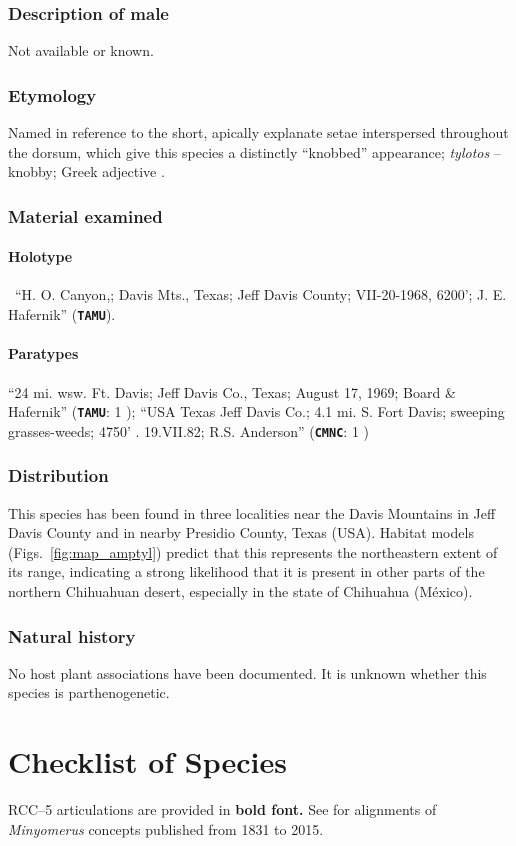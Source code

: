 \documentclass[fleqn,10pt,lineno]{wlpeerj} %
\begin{document}
		\subsubsection*{Description of male}
			Not available or known.
		\subsubsection*{Etymology}
			Named in reference to the short, apically explanate setae interspersed throughout the dorsum, which give this species a distinctly ``knobbed'' appearance; \textit{tylotos} -- knobby; Greek adjective \citep{brown1956}.
		\subsubsection*{Material examined}
			\paragraph{Holotype}
				\female~``H. O. Canyon,; Davis Mts., Texas; Jeff Davis County; VII-20-1968, 6200'; J. E. Hafernik'' (\texttt{\textbf{TAMU}}).
			\paragraph{Paratypes}
				``24 mi. wsw. Ft. Davis; Jeff Davis Co., Texas; August 17, 1969; Board \& Hafernik'' (\texttt{\textbf{TAMU}}: 1 \female);
				``USA Texas Jeff Davis Co.; 4.1 mi. S. Fort Davis; sweeping grasses-weeds; 4750' . 19.VII.82; R.S. Anderson'' (\texttt{\textbf{CMNC}}: 1 \female)
		\subsubsection*{Distribution}
			This species has been found in three localities near the Davis Mountains in Jeff Davis County and in nearby Presidio County, Texas (USA).
			Habitat models (Figs.~\ref{fig:map_amptyl}) predict that this represents the northeastern extent of its range, indicating a strong likelihood that it is present in other parts of the northern Chihuahuan desert, especially in the state of Chihuahua (M\'{e}xico).
		\subsubsection*{Natural history}
			No host plant associations have been documented.
			It is unknown whether this species is parthenogenetic.
\newpage
\section*{Checklist of Species}\label{sec:checklist}
	RCC--5 articulations are provided in \textbf{bold font.} See \citet{jansen2015} for alignments of \textit{Minyomerus} concepts published from 1831 to 2015. 
	
\end{document}
